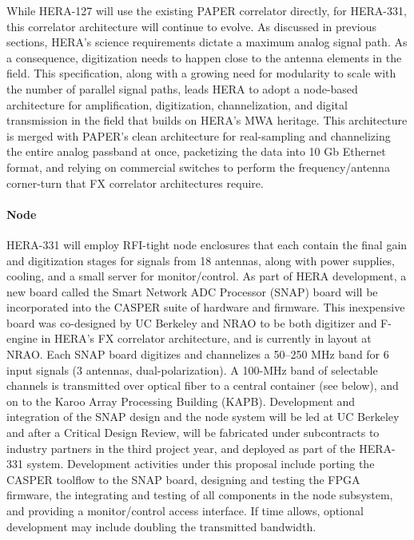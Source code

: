 \documentclass[preprint]{aastex}
\begin{document}
While HERA-127 will use the existing PAPER correlator directly, for
HERA-331, this correlator architecture will continue to evolve.  As discussed in previous sections,
HERA's science requirements dictate a maximum analog signal path.  As a consequence,
digitization needs to happen close to the antenna
elements in the field.  This specification, along with a growing need for modularity to scale with the number of parallel signal paths,
leads HERA to adopt a node-based architecture for amplification, digitization, channelization, and digital
transmission in the field that builds on HERA's MWA heritage.  This architecture is merged with PAPER's clean 
architecture for real-sampling and channelizing the entire analog passband at once, packetizing the data into
10 Gb Ethernet format, and relying on commercial switches to perform the frequency/antenna corner-turn that
FX correlator architectures require. 

\paragraph{Node}



HERA-331 will employ RFI-tight node enclosures that each contain the final gain and digitization stages for
signals from 18 antennas, along with power supplies, cooling, and a small server for monitor/control.  
As part of HERA development,
a new board called the Smart Network ADC Processor (SNAP) board will be incorporated 
into the CASPER suite of hardware and firmware. This inexpensive board was co-designed by UC Berkeley and NRAO to be
both digitizer and F-engine in HERA's FX correlator architecture,
and is currently in layout at NRAO.  Each SNAP board 
digitizes and channelizes a 50--250 MHz band for 6 input signals (3 antennas, dual-polarization).
A 100-MHz band of selectable channels is transmitted over optical fiber
to a central container (see below), and on to the Karoo Array Processing Building (KAPB).  Development and integration of the SNAP
design and the node system will be led at UC Berkeley and after a Critical Design Review, will be fabricated
under subcontracts to industry partners in the third project year, and deployed as part of the HERA-331 system.
Development activities under this proposal include porting the CASPER toolflow to
the SNAP board, designing and testing the FPGA firmware,
the integrating and testing of all components in the node subsystem, and providing a monitor/control
access interface.  If time allows, optional development may include doubling the transmitted bandwidth.
\end{document}
